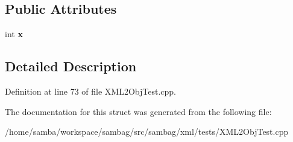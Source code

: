 \subsection*{Public Attributes}
\begin{DoxyCompactItemize}
\item 
\hypertarget{struct_object_a_a0637988cc6653761f9d0dc14b5343c18}{
int {\bfseries x}}
\label{struct_object_a_a0637988cc6653761f9d0dc14b5343c18}

\end{DoxyCompactItemize}


\subsection{Detailed Description}


Definition at line 73 of file XML2ObjTest.cpp.



The documentation for this struct was generated from the following file:\begin{DoxyCompactItemize}
\item 
/home/samba/workspace/sambag/src/sambag/xml/tests/XML2ObjTest.cpp\end{DoxyCompactItemize}

